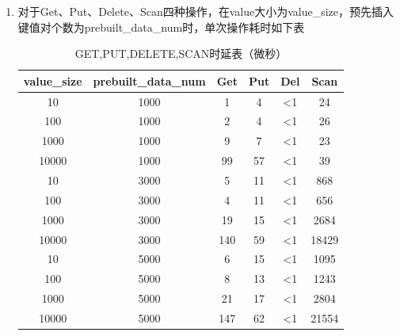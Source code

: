 \documentclass[UTF8]{article}
\begin{document}
\begin{enumerate}
    \item 对于Get、Put、Delete、Scan四种操作，在value大小为value\_size，预先插入键值对个数为prebuilt\_data\_num时，单次操作耗时如下表
    \begin{table}[H]
    \centering
    \begin{tabular}{|c|c|c|c|c|c|}
    \hline
    value\_size & prebuilt\_data\_num & Get & Put & Del & Scan \\
    \hline
    10 & 1000 & 1 & 4 & <1 & 24 \\
    100 & 1000 & 2 & 4 & <1 & 26 \\
    1000 & 1000 & 9 & 7 & <1 & 23 \\
    10000 & 1000 & 99 & 57 & <1 & 39 \\
    10 & 3000 & 5 & 11 & <1 & 868 \\
    100 & 3000 & 4 & 11 & <1 & 656 \\
    1000 & 3000 & 19 & 15 & <1 & 2684 \\
    10000 & 3000 & 140 & 59 & <1 & 18429 \\
    10 & 5000 & 6 & 15 & <1 & 1095 \\
    100 & 5000 & 8 & 13 & <1 & 1243 \\
    1000 & 5000 & 21 & 17 & <1 & 2804 \\
    10000 & 5000 & 147 & 62 & <1 & 21554 \\
    \hline
    \end{tabular}
    \caption{GET,PUT,DELETE,SCAN时延表（微秒）}
    \end{table}


\end{enumerate}
\end{document}

